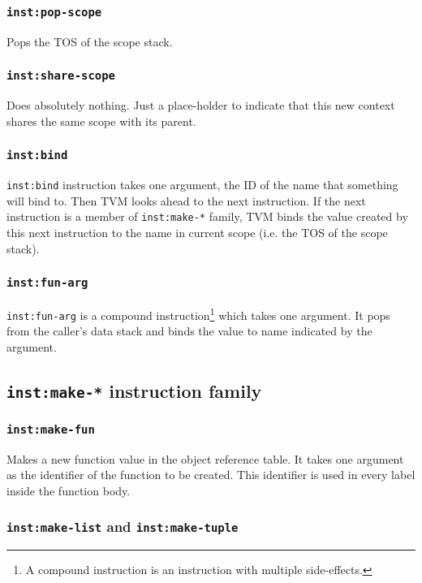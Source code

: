 \documentclass{article}
\newcommand{\inst}[1] {\texttt{inst:#1}}
\begin{document}
\subsubsection{\inst{pop-scope}}

Pops the TOS of the scope stack.

\subsubsection{\inst{share-scope}}

Does absolutely nothing. Just a place-holder to indicate that this new context shares the same scope with its parent.

\subsubsection{\inst{bind}}

\inst{bind} instruction takes one argument, the ID of the name that something will bind to. Then TVM looks ahead to the next instruction. If the next instruction is a member of \inst{make-*} family, TVM binds the value created by this next instruction to the name in current scope (i.e. the TOS of the scope stack).

\subsubsection{\inst{fun-arg}}

\inst{fun-arg} is a compound instruction\footnote{A compound instruction is an instruction with multiple side-effects.} which takes one argument. It pops from the caller's data stack and binds the value to name indicated by the argument.

\subsection{\inst{make-*} instruction family}

\subsubsection{\inst{make-fun}}

Makes a new function value in the object reference table. It takes one argument as the identifier of the function to be created. This identifier is used in every label inside the function body.

\subsubsection{\inst{make-list} and \inst{make-tuple}}
\end{document}
